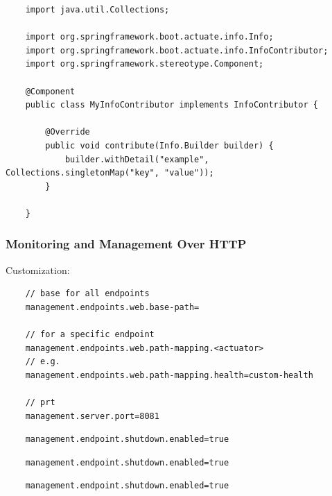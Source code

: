 \documentclass{scrartcl}
\begin{document}
\begin{lstlisting}
    import java.util.Collections;

    import org.springframework.boot.actuate.info.Info;
    import org.springframework.boot.actuate.info.InfoContributor;
    import org.springframework.stereotype.Component;

    @Component
    public class MyInfoContributor implements InfoContributor {

        @Override
        public void contribute(Info.Builder builder) {
            builder.withDetail("example", Collections.singletonMap("key", "value"));
        }

    }
\end{lstlisting}



\subsubsection{Monitoring and Management Over HTTP}

Customization:

\begin{lstlisting}
    // base for all endpoints
    management.endpoints.web.base-path=

    // for a specific endpoint
    management.endpoints.web.path-mapping.<actuator>
    // e.g.
    management.endpoints.web.path-mapping.health=custom-health

    // prt
    management.server.port=8081
\end{lstlisting}

\begin{lstlisting}
    management.endpoint.shutdown.enabled=true
\end{lstlisting}
\begin{lstlisting}
    management.endpoint.shutdown.enabled=true
\end{lstlisting}
\begin{lstlisting}
    management.endpoint.shutdown.enabled=true
\end{lstlisting}
\end{document}
